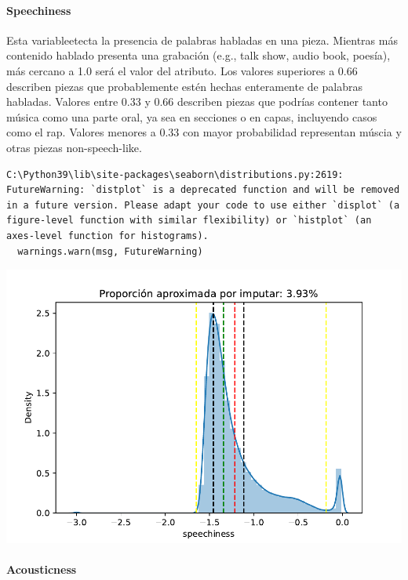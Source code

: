 \documentclass[
  letterpaper,
  DIV=11,
  numbers=noendperiod]{scrartcl}
\let\oldparagraph\paragraph
\renewcommand{\paragraph}[1]{\oldparagraph{#1}\mbox{}}
\begin{document}
\hypertarget{speechiness}{%
\paragraph{Speechiness}\label{speechiness}}

Esta variableetecta la presencia de palabras habladas en una pieza.
Mientras más contenido hablado presenta una grabación (e.g., talk show,
audio book, poesía), más cercano a 1.0 será el valor del atributo. Los
valores superiores a 0.66 describen piezas que probablemente estén
hechas enteramente de palabras habladas. Valores entre 0.33 y 0.66
describen piezas que podrías contener tanto música como una parte oral,
ya sea en secciones o en capas, incluyendo casos como el rap. Valores
menores a 0.33 con mayor probabilidad representan múscia y otras piezas
non-speech-like.

\begin{verbatim}
C:\Python39\lib\site-packages\seaborn\distributions.py:2619: FutureWarning: `distplot` is a deprecated function and will be removed in a future version. Please adapt your code to use either `displot` (a figure-level function with similar flexibility) or `histplot` (an axes-level function for histograms).
  warnings.warn(msg, FutureWarning)
\end{verbatim}

\includegraphics{informe_01_files/figure-pdf/unnamed-chunk-26-17.pdf}

\hypertarget{acousticness}{%
\paragraph{Acousticness}\label{acousticness}}
\end{document}
